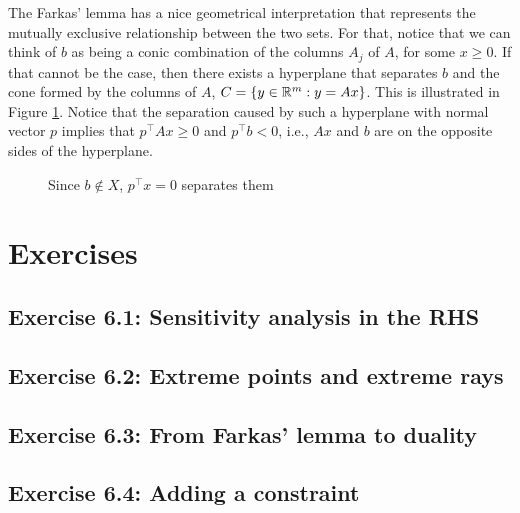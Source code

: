 The Farkas' lemma has a nice geometrical interpretation that represents the mutually exclusive relationship between the two sets. For that, notice that we can think of $b$ as being a conic combination of the columns $A_j$ of $A$, for some $x \ge 0$. If that cannot be the case, then there exists a hyperplane that separates $b$ and the cone formed by the columns of $A$, $C=\left\{ y \in \mathbb{R}^m : y = Ax \right \}$. This is illustrated in Figure \ref{p1c6:fig:farkas}. Notice that the separation caused by such a hyperplane with normal vector $p$ implies that $p^\top Ax \geq 0$ and $p^\top b < 0$, i.e., $Ax$ and $b$ are on the opposite sides of the hyperplane. 

\begin{figure}[h]
	\caption{Since $b \not\in X$, $p^\top x=0$ separates them} \label{p1c6:fig:farkas}	
\end{figure}




\pagebreak	

\section{Exercises}

\subsection*{Exercise 6.1: Sensitivity analysis in the RHS}


\subsection*{Exercise 6.2: Extreme points and extreme rays}


\subsection*{Exercise 6.3: From Farkas' lemma to duality}


\subsection*{Exercise 6.4: Adding a constraint}








